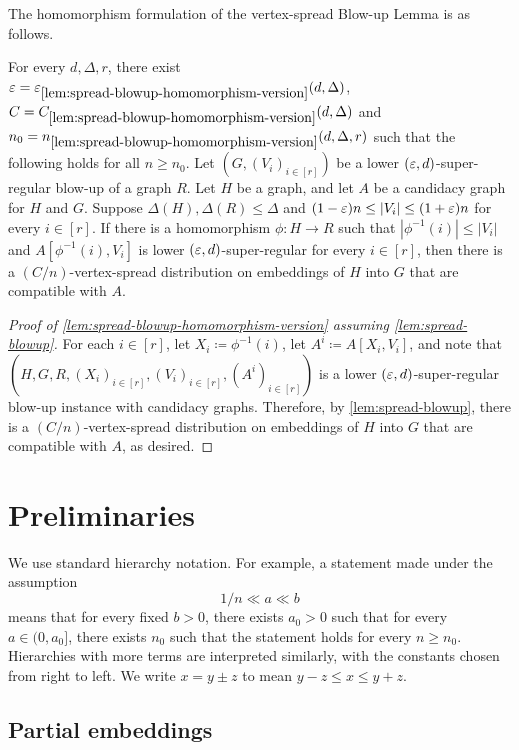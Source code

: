 \documentclass[11pt]{amsart}
\begin{document}
The homomorphism formulation of the vertex-spread Blow-up Lemma is as follows.

\begin{theorem}\label{lem:spread-blowup-homomorphism-version}
    For every $d, \Delta, r$, there exist $\varepsilon = \varepsilon_{\ref*{lem:spread-blowup-homomorphism-version}}(d, \Delta)$, $C = C_{\ref*{lem:spread-blowup-homomorphism-version}}(d, \Delta)$ and $n_0 = n_{\ref*{lem:spread-blowup-homomorphism-version}}(d, \Delta, r)$ such that the following holds for all $n \geq n_0$.  
    Let $(G, (V_i)_{i \in [r]})$ be a lower $(\varepsilon, d)$-super-regular blow-up of a graph $R$.
    Let $H$ be a graph, and let $A$ be a candidacy graph for $H$ and $G$.
    Suppose $\Delta(H), \Delta(R) \leq \Delta$ and $(1 - \varepsilon)n \leq |V_i| \leq (1 + \varepsilon)n$ for every $i \in [r]$.
    If there is a homomorphism $\phi : H \rightarrow R$ such that $|\phi^{-1}(i)| \leq |V_i|$ and $A[\phi^{-1}(i), V_i]$ is lower $(\varepsilon, d)$-super-regular for every $i \in [r]$, then there is a $(C / n)$-vertex-spread distribution on embeddings of $H$ into $G$ that are compatible with $A$.
\end{theorem}
\begin{proof}[Proof of \cref{lem:spread-blowup-homomorphism-version} assuming \cref{lem:spread-blowup}]
    For each $i \in [r]$, let $X_i \coloneqq \phi^{-1}(i)$, let $A^i \coloneqq A[X_i, V_i]$, and note that $(H, G, R, (X_i)_{i \in [r]}, (V_i)_{i\in[r]}, (A^i)_{i\in[r]})$ is a lower $(\varepsilon, d)$-super-regular blow-up instance with candidacy graphs.
    Therefore, by \cref{lem:spread-blowup}, there is a $(C/n)$-vertex-spread distribution on embeddings of $H$ into $G$ that are compatible with $A$, as desired.
\end{proof}

\section{Preliminaries}\label{sect:preliminaries}

We use standard hierarchy notation.  For example, a statement made under the
assumption
\[
    1/n\ll a\ll b
\]
means that for every fixed $b>0$, there exists $a_0>0$ such that for every
$a\in(0,a_0]$, there exists $n_0$ such that the statement holds for every
$n\geq n_0$.  Hierarchies with more terms are interpreted similarly, with the
constants chosen from right to left.  We write $x=y\pm z$ to mean
$y-z\leq x\leq y+z$.

\subsection{Partial embeddings}\label{sect:partial-embeddings}
\end{document}
